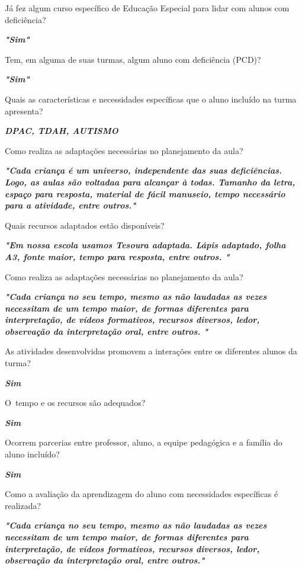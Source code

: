 \documentclass[
	12pt,				%
	openright,			%
	oneside,
	a4paper,			%
	chapter=TITLE,		%
	section=TITLE,		%
	sumario=abnt-6027-2012,
	english,			%
	brazil				%
]{abntex2}
\begin{document}
	Já fez algum curso específico de Educação Especial para lidar com alunos com deficiência?
	
	\textbf{\textit{"Sim"}}
	
	Tem, em alguma de suas turmas, algum aluno com deficiência (PCD)?
	
	\textbf{\textit{"Sim"}}
	
	
	Quais as características e necessidades específicas que o aluno incluído na turma apresenta?
	
	\textbf{\textit{DPAC, TDAH, AUTISMO}}

	
	Como realiza as adaptações necessárias no planejamento da aula?
	
	\textbf{\textit{
		"Cada criança é um universo, independente das suas deficiências. Logo, as aulas são voltadaa para alcançar à todas. Tamanho da letra, espaço para resposta, material de fácil manuseio, tempo necessário para a atividade, entre outros."
	}}

	Quais recursos adaptados estão disponíveis?

	\textbf{\textit{
		"Em nossa escola usamos Tesoura adaptada. Lápis adaptado, folha A3, fonte maior, tempo para resposta, entre outros. "
	}}
	
	Como realiza as adaptações necessárias no planejamento da aula?

	
	\textbf{\textit{
		"Cada criança no seu  tempo,  mesmo as não laudadas as vezes necessitam de um tempo maior, de formas diferentes para interpretação, de vídeos formativos, recursos diversos, ledor, observação da interpretação oral, entre outros. "
	}}
	
	
	As atividades desenvolvidas promovem a interações entre os diferentes alunos da turma?	
	
	\textbf{\textit{Sim}}
	
	O tempo e os recursos são adequados?	
	
	\textbf{\textit{Sim}}
	
	Ocorrem parcerias entre professor, aluno, a equipe pedagógica e a família do aluno incluído?	
	
	\textbf{\textit{Sim}}
	
	Como a avaliação da aprendizagem do aluno com necessidades específicas é realizada?	
	
	\textbf{\textit{"Cada criança no seu  tempo,  mesmo as não laudadas as vezes necessitam de um tempo maior, de formas diferentes para interpretação, de vídeos formativos, recursos diversos, ledor, observação da interpretação oral, entre outros."}}
	
\end{document}

